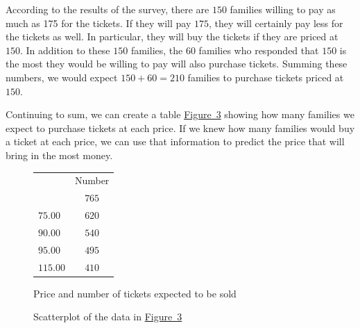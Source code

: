 \documentclass[10pt,]{book}
\theoremstyle{ptxdefinitionnotitle}
\theoremstyle{ptxdefinitiontitle}
\numberwithin{equation}{section}
\newcommand{\hrulemedium}{\noalign{\hrule height 0.07em}}
\begin{document}
\par
\hypertarget{p-20}{}%
According to the results of the survey, there are \(150\) families willing to pay as much as 175 for the tickets. If they will pay \textdollar{}\(175\), they will certainly pay less for the tickets as well. In particular, they will buy the tickets if they are priced at \textdollar{}\(150\). In addition to these \(150\) families, the \(60\) families who responded that \textdollar{}\(150\) is the most they would be willing to pay will also purchase tickets. Summing these numbers, we would expect \(150 + 60 = 210\) families to purchase tickets priced at \textdollar{}\(150\).%
\par
\hypertarget{p-21}{}%
Continuing to sum, we can create a table \hyperref[results-of-the-survey-summed]{Figure~3} showing how many families we expect to purchase tickets at each price. If we knew how many families would buy a ticket at each price, we can use that information to predict the price that will bring in the most money.%
\begin{figure}
\centering
\begin{tabular}{cc}\hrulemedium
\multicolumn{1}{l}{Maximum Price (\textdollar{})}&Number\tabularnewline\hrulemedium
\multicolumn{1}{l}{\(50.00\)}&\(765\)\tabularnewline[0pt]
\multicolumn{1}{l}{\(75.00\)}&\(620\)\tabularnewline[0pt]
\multicolumn{1}{l}{\(90.00\)}&\(540\)\tabularnewline[0pt]
\multicolumn{1}{l}{\(95.00\)}&\(495\)\tabularnewline[0pt]
\multicolumn{1}{l}{\(115.00\)}&\(410\)
\end{tabular}
\caption{Price and number of tickets expected to be sold\label{results-of-the-survey-summed}}
\end{figure}
\begin{figure}
\centering
{
}
\caption{Scatterplot of the data in \hyperref[results-of-the-survey-summed]{Figure~3}\label{scatterplot-of-the-ticket-data-summed}}
\end{figure}
\end{document}
